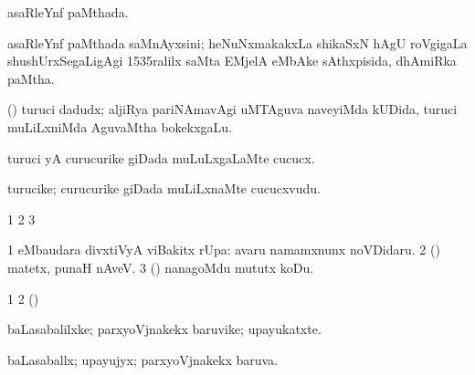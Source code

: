 {{\bentry
{} 
\gl{\gu}
\expl{}
\bmng
asaRleYnf paMthada. 
\emng
\eentry

\bentry
{} 
\gl{\nA}
\expl{}
\bmng
asaRleYnf paMthada saMnAyxsini; heNuNxmakakxLa shikaSxN hAgU roVgigaLa shushUrxSegaLigAgi 1535ralilx saMta EMjelA eMbAke sAthxpisida, dhAmiRka paMtha. 
\emng
\eentry

\bentry
{} 
\gl{\nA}
\expl{}
\bmng
(\veYshA) turuci dadudx; aljiRya pariNAmavAgi uMTAguva naveyiMda kUDida, turuci muLiLxniMda AguvaMtha bokekxgaLu. 
\emng
\eentry

\bentry
{} 
\gl{\sakirx}
\expl{}
\bmng
turuci yA curucurike giDada muLuLxgaLaMte cucucx. 
\emng
\eentry

\bentry
{} 
\gl{\nA}
\expl{}
\bmng
turucike; curucurike giDada muLiLxnaMte cucucxvudu. 
\emng
\eentry

\bentry
{} 
\gl{\nA}
\expl{}
\bmng
{} 
\emng
\eentry

\bentry
{}
\gl{\saMkiSx}
\expl{}
\bmng
\bnum
\num{1}  
\num{2}  
\num{3}  
\enum
\emng
\eentry

\bentry
{} 
\gl{\sanA}
\expl{}
\bmng
\bnum
\num{1}  eMbaudara divxtiVyA viBakitx rUpa:  avaru namamxnunx noVDidaru. 
\num{2} (\AmA)  matetx, punaH nAveV. 
\num{3} (\AmA)  nanagoMdu mututx koDu. 
\enum
\emng
\eentry

\bentry
{} 
\gl{\saMkiSx}
\expl{}
\bmng
\bnum
\num{1}  
\num{2} (\ame)  
\enum
\emng
\eentry

\bentry
{} 
\gl{\nA}
\expl{}
\bmng
baLasabalilxke; parxyoVjnakekx baruvike; upayukatxte. 
\emng
\eentry

\bentry
{} 
\gl{\gu}
\expl{}
\bmng
baLasaballx; upayujyx; parxyoVjnakekx baruva. 
\emng
\eentry

\bentry
{} 
\gl{\nA}
\expl{}
\bmng
{} 
\emng
\eentry

}}
